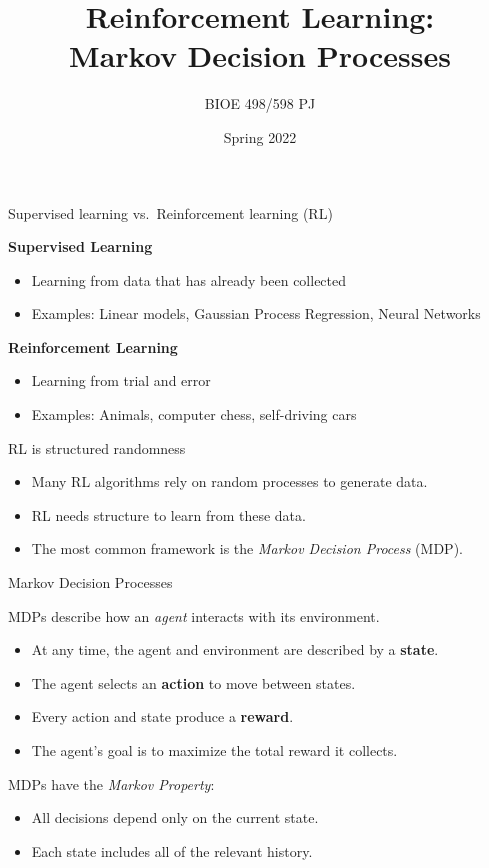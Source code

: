 \documentclass[9pt]{beamer}
\title{Reinforcement Learning:\\Markov Decision Processes}
\author{BIOE 498/598 PJ}
\date{Spring 2022}
\newcommand\pskip{\pause\bigskip}
\newcommand\lspace{\addtolength{\itemsep}{0.5\baselineskip}}
\begin{document}
\frame{\titlepage}

\begin{frame}{Supervised learning vs.\ Reinforcement learning (RL)}

\textbf{Supervised Learning}
\begin{itemize}
	\item Learning from data that has already been collected
	\item Examples: Linear models, Gaussian Process Regression, Neural Networks
\end{itemize}

\pskip
\textbf{Reinforcement Learning}
\begin{itemize}
	\item Learning from trial and error
	\item Examples: Animals, computer chess, self-driving cars
\end{itemize}
	
\end{frame}

\begin{frame}{RL is structured randomness}

\begin{itemize}\lspace
	\item Many RL algorithms rely on random processes to generate data.
	\item RL needs structure to learn from these data.
	\item The most common framework is the \emph{Markov Decision Process} (MDP).
\end{itemize}	

\end{frame}

\begin{frame}{Markov Decision Processes}
	
MDPs describe how an \emph{agent} interacts with its environment.
\bigskip
\begin{itemize}\lspace
	\item At any time, the agent and environment are described by a \textbf{state}.
	\item The agent selects an \textbf{action} to move between states.
	\item Every action and state produce a \textbf{reward}.
	\item The agent's goal is to maximize the total reward it collects.
\end{itemize}

\pskip
MDPs have the \emph{Markov Property}:
\begin{itemize}
	\item All decisions depend only on the current state.
	\item Each state includes all of the relevant history.
\end{itemize}

\end{frame}
\end{document}
